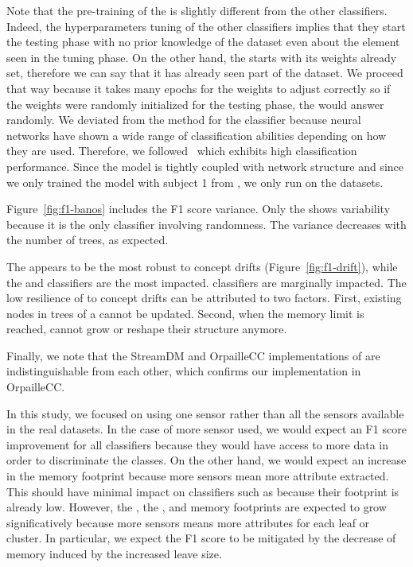 Note that the pre-training of the \FNN is slightly different from the other
classifiers. Indeed, the hyperparameters tuning of the other classifiers implies
that they start the testing phase with no prior knowledge of the dataset even
about the element seen in the tuning phase. On the other hand, the \FNN starts
with its weights already set, therefore we can say that it has already seen part
of the dataset. We proceed that way because it takes many epochs for the weights
to adjust correctly so if the weights were randomly initialized for the testing
phase, the \FNN would answer randomly.  We deviated from the method for the \FNN
classifier because neural networks have shown a wide range of classification
abilities depending on how they are used.  Therefore, we
followed~\cite{omid_2019} which exhibits high classification performance. Since
the \FNN model is tightly coupled with network structure and since we only
trained the model with subject 1 from \banosdataset, we only run \FNN on the
\banosdataset datasets.

Figure~\ref{fig:f1-banos} includes the F1 score variance. Only the
\mondrianforest shows variability because it is the only classifier involving
randomness. The variance decreases with the number of trees, as expected.

The \hoeffdingtree appears to be the most robust to concept drifts
(Figure~\ref{fig:f1-drift}), while the \mondrianforest and \naivebayes
classifiers are the most impacted. \mcnn classifiers are marginally impacted.
The low resilience of \mondrianforest to concept drifts can be attributed to
two factors. First, existing nodes in trees of a \mondrianforest cannot be updated.
Second, when the memory limit is reached, \mondriantrees cannot grow
or reshape their structure anymore.

Finally, we note that the StreamDM and OrpailleCC implementations of
\naivebayes are indistinguishable from each other, which confirms our
implementation in OrpailleCC.

In this study, we focused on using one sensor rather than all the sensors
available in the real datasets. In the case of more sensor used, we would expect
an F1 score improvement for all classifiers because they would have access to
more data in order to discriminate the classes. On the other hand, we would
expect an increase in the memory footprint because more sensors mean more
attribute extracted. This should have minimal impact on classifiers such as
\naivebayes because their footprint is already low. However, the
\mondrianforest, the \hoeffdingtree, and \mcnn memory footprints are expected to
grow significatively because more sensors means more attributes for each leaf or
cluster. In particular, we expect the \mondrianforest F1 score to be mitigated
by the decrease of memory induced by the increased leave size.

